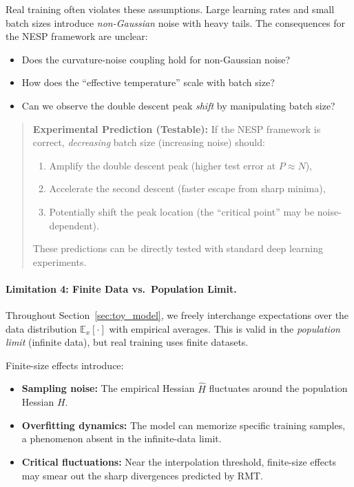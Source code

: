 \documentclass[
  journal=largetwo,
  year=2025,
  volume=37,
]{cup-journal}
\begin{document}
Real training often violates these assumptions. Large learning rates and small batch sizes introduce \textit{non-Gaussian} noise with heavy tails. The consequences for the NESP framework are unclear:
\begin{itemize}
    \item Does the curvature-noise coupling hold for non-Gaussian noise?
    \item How does the ``effective temperature'' scale with batch size?
    \item Can we observe the double descent peak \textit{shift} by manipulating batch size?
\end{itemize}

\begin{quote}
\textbf{Experimental Prediction (Testable):} If the NESP framework is correct, \textit{decreasing} batch size (increasing noise) should:
\begin{enumerate}
    \item Amplify the double descent peak (higher test error at $P \approx N$),
    \item Accelerate the second descent (faster escape from sharp minima),
    \item Potentially shift the peak location (the ``critical point'' may be noise-dependent).
\end{enumerate}
These predictions can be directly tested with standard deep learning experiments.
\end{quote}

\paragraph{Limitation 4: Finite Data vs.\ Population Limit.}

Throughout Section~\ref{sec:toy_model}, we freely interchange expectations over the data distribution $\mathbb{E}_x[\cdot]$ with empirical averages. This is valid in the \textit{population limit} (infinite data), but real training uses finite datasets.

Finite-size effects introduce:
\begin{itemize}
    \item \textbf{Sampling noise:} The empirical Hessian $\hat{H}$ fluctuates around the population Hessian $H$.
    \item \textbf{Overfitting dynamics:} The model can memorize specific training samples, a phenomenon absent in the infinite-data limit.
    \item \textbf{Critical fluctuations:} Near the interpolation threshold, finite-size effects may smear out the sharp divergences predicted by RMT.
\end{itemize}
\end{document}
